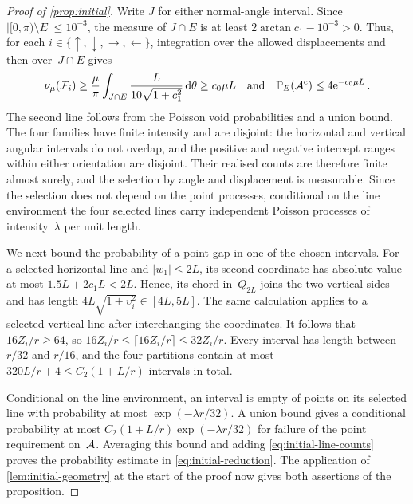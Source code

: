 \documentclass[11pt,letterpaper]{article}
\begin{document}
\begin{proof}[Proof of \cref{prop:initial}]
Write $J$ for either normal-angle interval. Since $\lvert[0,\pi)\setminus E\rvert\le10^{-3}$, the measure of $J\cap E$ is at least $2\arctan c_1-10^{-3}>0$. Thus, for each $i\in\{\uparrow,\downarrow,\rightarrow,\leftarrow\}$, integration over the allowed displacements and then over~$J\cap E$ gives
\begin{equation}\label{eq:initial-line-counts}
  \begin{aligned}
    \nu_\mu(\mathcal F_i)\ge\frac\mu\pi\int_{J\cap E}\frac{L}{10\sqrt{1+c_1^2}}\,\mathrm{d}\theta\ge c_0\mu L\quad\text{and}\quad    \mathbb P_E(\mathcal A^{\mathrm{c}})\le4\mathrm{e}^{-c_0\mu L}\,.
  \end{aligned}
\end{equation}
The second line follows from the Poisson void probabilities and a union bound. The four families have finite intensity and are disjoint: the horizontal and vertical angular intervals do not overlap, and the positive and negative intercept ranges within either orientation are disjoint. Their realised counts are therefore finite almost surely, and the selection by angle and displacement is measurable. Since the selection does not depend on the point processes, conditional on the line environment the four selected lines carry independent Poisson processes of intensity~$\lambda$ per unit length.

We next bound the probability of a point gap in one of the chosen intervals. For a selected horizontal line and $\lvert w_1\rvert\le2L$, its second coordinate has absolute value at most $1.5L+2c_1 L<2L$. Hence, its chord in~$Q_{2L}$ joins the two vertical sides and has length $4L\sqrt{1+\upsilon_i^2}\in[4L,5L]$. The same calculation applies to a selected vertical line after interchanging the coordinates. It follows that $16Z_i/r\ge64$, so $16Z_i/r\le\lceil16Z_i/r\rceil\le32Z_i/r$. Every interval has length between $r/32$ and $r/16$, and the four partitions contain at most $320L/r+4\le C_2(1+L/r)$ intervals in total.

Conditional on the line environment, an interval is empty of points on its selected line with probability at most $\exp(-\lambda r/32)$. A union bound gives a conditional probability at most $C_2(1+L/r)\exp(-\lambda r/32)$ for failure of the point requirement on~$\mathcal A$. Averaging this bound and adding \eqref{eq:initial-line-counts} proves the probability estimate in \eqref{eq:initial-reduction}. The application of \cref{lem:initial-geometry} at the start of the proof now gives both assertions of the proposition.
\end{proof}
\end{document}
